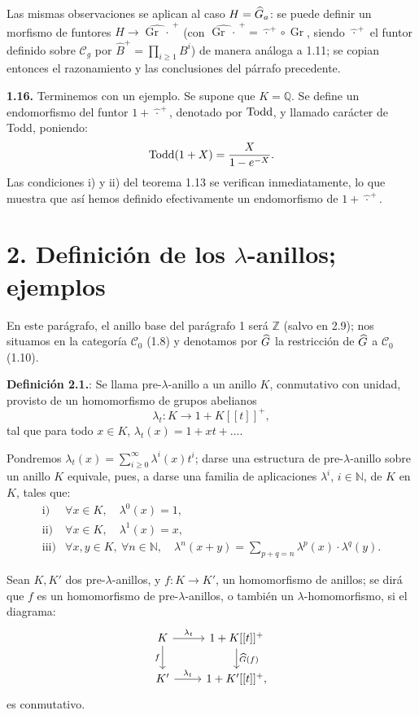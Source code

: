 Las mismas observaciones se aplican al caso \(H=\widehat G_a\): se puede definir un morfismo de funtores \(H\longrightarrow\widehat{\operatorname{Gr}\,\cdot\,}^{+}\) (con \(\widehat{\operatorname{Gr}\,\cdot\,}^{+}=\widehat{\,\cdot\,}^{+}\circ\operatorname{Gr}\), siendo \(\widehat{\,\cdot\,}^{+}\) el funtor definido sobre \(\mathcal C_g\) por \(\widehat B^+=\prod_{i\geq1}B^i\)) de manera análoga a 1.11; se copian entonces el razonamiento y las conclusiones del párrafo precedente.

\textbf{1.16.} Terminemos con un ejemplo. Se supone que \(K=\mathbb Q\). Se define un endomorfismo del funtor \(1+\widehat{\,\cdot\,}^{+}\), denotado por \(\operatorname{Todd}\), y llamado carácter de Todd, poniendo:
\[
  \operatorname{Todd}(1+X)=\frac{X}{1-e^{-X}}.
\]
Las condiciones i) y ii) del teorema 1.13 se verifican inmediatamente, lo que muestra que así hemos definido efectivamente un endomorfismo de \(1+\widehat{\,\cdot\,}^{+}\).

\section*{2. Definición de los \(\lambda\)-anillos; ejemplos}

En este parágrafo, el anillo base del parágrafo 1 será \(\mathbb Z\) (salvo en 2.9); nos situamos en la categoría \(\mathcal C_0\) (1.8) y denotamos por \(\widehat G\) la restricción de \(\widehat G\) a \(\mathcal C_0\) (1.10).

\textbf{Definición 2.1.}: Se llama pre-\(\lambda\)-anillo a un anillo \(K\), conmutativo con unidad, provisto de un homomorfismo de grupos abelianos
\[
  \lambda_t:K\longrightarrow1+K[[t]]^+,
\]
tal que para todo \(x\in K\), \(\lambda_t(x)=1+xt+\ldots\).

Pondremos \(\lambda_t(x)=\sum_{i\geq0}^{\infty}\lambda^i(x)t^i\); darse una estructura de pre-\(\lambda\)-anillo sobre un anillo \(K\) equivale, pues, a darse una familia de aplicaciones \(\lambda^i\), \(i\in\mathbb N\), de \(K\) en \(K\), tales que:
\[
\begin{array}{ll}
\text{i)}& \forall x\in K,\quad \lambda^0(x)=1,\\[0.3em]
\text{ii)}& \forall x\in K,\quad \lambda^1(x)=x,\\[0.3em]
\text{iii)}& \forall x,y\in K,\ \forall n\in\mathbb N,\quad
\lambda^n(x+y)=\displaystyle\sum_{p+q=n}\lambda^p(x)\cdot\lambda^q(y).
\end{array}
\]

Sean \(K,K'\) dos pre-\(\lambda\)-anillos, y \(f:K\to K'\), un homomorfismo de anillos; se dirá que \(f\) es un homomorfismo de pre-\(\lambda\)-anillos, o también un \(\lambda\)-homomorfismo, si el diagrama:
\[
\begin{tikzcd}
K \arrow[r,"\lambda_t"] \arrow[d,"f"'] &
1+K[[t]]^+ \arrow[d,"\Ghat(f)"]\\
K' \arrow[r,"\lambda_t"] &
1+K'[[t]]^+,
\end{tikzcd}
\]
es conmutativo.

